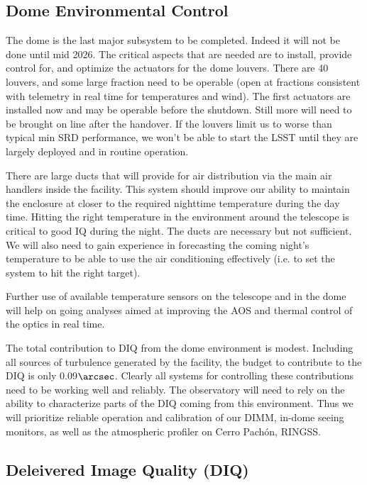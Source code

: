 \subsection{Dome Environmental Control}
The dome is the last major subsystem to be completed. Indeed it will not be done until mid 2026. The critical aspects that are needed are to install, provide control for, and optimize the actuators for the dome louvers. There are 40 louvers, and some large fraction need to be operable (open at fractions consistent with telemetry in real time for temperatures and wind). The first actuators are installed now and may be operable before the shutdown. Still more will need to be brought on line after the handover. If the louvers limit us to worse than typical min SRD performance, we won't be able to start the LSST until they are largely deployed and in routine operation. 

There are large ducts that will provide for air distribution via the main air handlers inside the facility. This system should improve our ability to maintain the enclosure at closer to the required nighttime temperature during the day time. Hitting the right temperature in the environment around the telescope is critical to good IQ during the night. The ducts are necessary but not sufficient. We will also need to gain experience in forecasting the coming night's temperature to be able to use the air conditioning effectively (i.e. to set the system to hit the right target). 

Further use of available temperature sensors on the telescope and in the dome will help on going analyses aimed at improving the AOS and thermal control of the optics in real time. 

The total contribution to DIQ from the dome environment is modest. Including all sources of turbulence generated by the facility, the budget to contribute to the DIQ is only 0.09$\arcsec$. Clearly all systems for controlling these contributions need to be working well and reliably. The observatory will need to rely on the ability to characterize parts of the DIQ coming from this environment. Thus we will prioritize reliable operation and calibration of our DIMM, in-dome seeing monitors, as well as the atmospheric profiler on Cerro Pach\'{on}, RINGSS.  

\subsection{Deleivered Image Quality (DIQ)}

